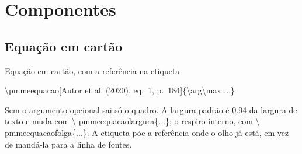 \documentclass[aspectratio=169,10pt]{beamer}
\newcommand{\cod}[1]{{\ttfamily\fontsize{6.4}{7.6}\selectfont\color{insperCinza}#1}}
\begin{document}
\section{Componentes}
\begin{frame}[plain]
\end{frame}

\subsection{Equação em cartão}
\begin{frame}{Equação em cartão, com a referência na etiqueta}
  \vspace{-0.3em}

  \vspace{-0.1em}
  \cod{\textbackslash pmmeequacao[Autor et al. (2020), eq.~1, p.~184]\{\textbackslash arg\textbackslash max ...\}}

  \vspace{0.7em}
  {\small Sem o argumento opcional sai só o quadro. A largura padrão é
  \num{0,94} da largura de texto e muda com \cod{\textbackslash
  pmmeequacaolargura\{...\}}; o respiro interno, com \cod{\textbackslash
  pmmeequacaofolga\{...\}}. A etiqueta põe a referência onde o olho já está,
  em vez de mandá-la para a linha de fontes.}
\end{frame}
\end{document}
